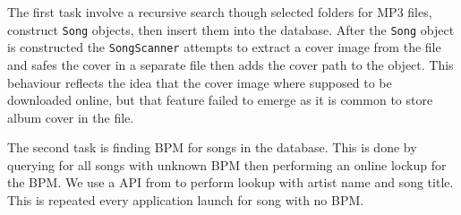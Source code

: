 The first task involve a recursive search though selected folders for MP3 files, construct \texttt{Song} objects, then insert them into the database. After the \texttt{Song} object is constructed the \texttt{SongScanner} attempts to extract a cover image from the file and safes the cover in a separate file then adds the cover path to the object. This behaviour reflects the idea that the cover image where supposed to be downloaded online, but that feature failed to emerge as it is common to store album cover in the file.

The second task is finding BPM for songs in the database. This is done by querying for all songs with unknown BPM then performing an online lockup for the BPM. We use a API from \citet{echonest:API} to perform lookup with artist name and song title. This is repeated every application launch for song with no BPM. 




